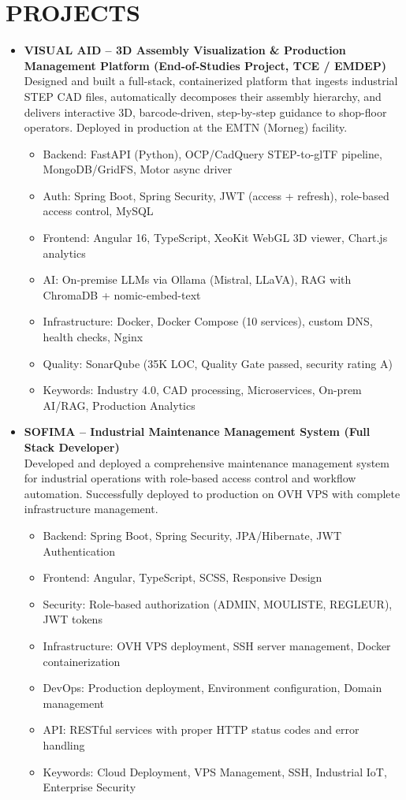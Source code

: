 \documentclass[paper=a4,fontsize=11pt]{scrartcl}
\newcommand{\NewPart}[1]{\section*{\uppercase{#1}}}
\begin{document}
\NewPart{Projects}
\begin{itemize}
    \item \textbf{VISUAL AID – 3D Assembly Visualization \& Production Management Platform (End-of-Studies Project, TCE / EMDEP)} \\
Designed and built a full-stack, containerized platform that ingests industrial STEP CAD files, automatically decomposes their assembly hierarchy, and delivers interactive 3D, barcode-driven, step-by-step guidance to shop-floor operators. Deployed in production at the EMTN (Morneg) facility.
\begin{itemize}
    \item Backend: FastAPI (Python), OCP/CadQuery STEP-to-glTF pipeline, MongoDB/GridFS, Motor async driver
    \item Auth: Spring Boot, Spring Security, JWT (access + refresh), role-based access control, MySQL
    \item Frontend: Angular 16, TypeScript, XeoKit WebGL 3D viewer, Chart.js analytics
    \item AI: On-premise LLMs via Ollama (Mistral, LLaVA), RAG with ChromaDB + nomic-embed-text
    \item Infrastructure: Docker, Docker Compose (10 services), custom DNS, health checks, Nginx
    \item Quality: SonarQube (35K LOC, Quality Gate passed, security rating A)
    \item Keywords: Industry 4.0, CAD processing, Microservices, On-prem AI/RAG, Production Analytics
\end{itemize}

    \item \textbf{SOFIMA – Industrial Maintenance Management System (Full Stack Developer)} \\ %
Developed and deployed a comprehensive maintenance management system for industrial operations with role-based access control and workflow automation. Successfully deployed to production on OVH VPS with complete infrastructure management.
\begin{itemize}
    \item Backend: Spring Boot, Spring Security, JPA/Hibernate, JWT Authentication
    \item Frontend: Angular, TypeScript, SCSS, Responsive Design
    \item Security: Role-based authorization (ADMIN, MOULISTE, REGLEUR), JWT tokens
    \item Infrastructure: OVH VPS deployment, SSH server management, Docker containerization
    \item DevOps: Production deployment, Environment configuration, Domain management
    \item API: RESTful services with proper HTTP status codes and error handling
    \item Keywords: Cloud Deployment, VPS Management, SSH, Industrial IoT, Enterprise Security
\end{itemize}


\end{itemize}
\end{document}
